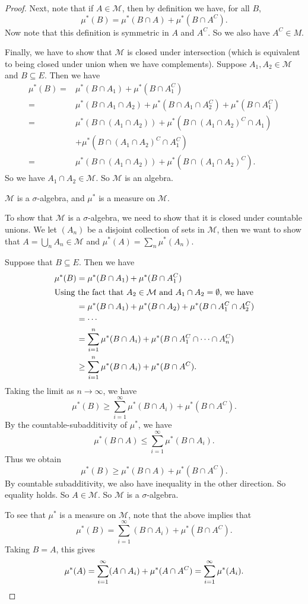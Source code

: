 \documentclass[a4paper]{article}
\begin{document}
\begin{proof}
  Next, note that if $A \in \mathcal{M}$, then by definition we have, for all $B$,
  \[
    \mu^*(B) = \mu^*(B \cap A) + \mu^*(B \cap A^C).
  \]
  Now note that this definition is symmetric in $A$ and $A^C$. So we also have $A^C \in M$.

  Finally, we have to show that $\mathcal{M}$ is closed under intersection (which is equivalent to being closed under union when we have complements). Suppose $A_1, A_2 \in \mathcal{M}$ and $B \subseteq E$. Then we have
  \begin{align*}
    \mu^*(B) ={}& \mu^*(B \cap A_1) + \mu^*(B \cap A_1^C)\\
    ={}& \mu^*(B \cap A_1 \cap A_2) + \mu^*(B \cap A_1 \cap A_2^C) + \mu^*(B \cap A_1^C)\\
    ={}& \mu^*(B \cap (A_1 \cap A_2)) + \mu^*(B \cap (A_1\cap A_2)^C \cap A_1) \\
    &+ \mu^*(B \cap (A_1 \cap A_2)^C \cap A_1^C)\\
    ={}& \mu^*(B \cap (A_1 \cap A_2)) + \mu^*(B \cap (A_1 \cap A_2)^C).
  \end{align*}
  So we have $A_1 \cap A_2 \in \mathcal{M}$. So $\mathcal{M}$ is an algebra.
  \begin{claim}
    $\mathcal{M}$ is a $\sigma$-algebra, and $\mu^*$ is a measure on $\mathcal{M}$.
  \end{claim}
  To show that $\mathcal{M}$ is a $\sigma$-algebra, we need to show that it is closed under countable unions. We let $(A_n)$ be a disjoint collection of sets in $\mathcal{M}$, then we want to show that $A = \bigcup_n A_n \in \mathcal{M}$ and $\mu^*(A) = \sum_n \mu^*(A_n)$.

  Suppose that $B \subseteq E$. Then we have
  \begin{align*}
    \mu^*(B) &= \mu^*(B \cap A_1) + \mu^*(B \cap A_1^C)\\
    \intertext{Using the fact that $A_2 \in \mathcal{M}$ and $A_1 \cap A_2 =\emptyset$, we have}
    &= \mu^*(B \cap A_1) + \mu^*(B \cap A_2) + \mu^*(B \cap A_1^C \cap A_2^C)\\
    &= \cdots\\
    &= \sum_{i = 1}^n \mu^*(B\cap A_i) + \mu^*(B \cap A_1^C \cap \cdots \cap A_n^C)\\
    &\geq \sum_{i = 1}^n \mu^*(B \cap A_i) + \mu^*(B \cap A^C).
  \end{align*}
  Taking the limit as $n \to \infty$, we have
  \[
    \mu^*(B) \geq \sum_{i = 1}^\infty \mu^*(B \cap A_i) + \mu^*(B \cap A^C).
  \]
  By the countable-subadditivity of $\mu^*$, we have
  \[
    \mu^*(B \cap A) \leq \sum_{i = 1}^\infty \mu^*(B \cap A_i).
  \]
  Thus we obtain
  \[
    \mu^*(B) \geq \mu^*(B \cap A) + \mu^*(B \cap A^C).
  \]
  By countable subadditivity, we also have inequality in the other direction. So equality holds. So $A \in \mathcal{M}$. So $\mathcal{M}$ is a $\sigma$-algebra.

  To see that $\mu^*$ is a measure on $\mathcal{M}$, note that the above implies that
  \[
    \mu^*(B) = \sum_{i = 1}^\infty (B \cap A_i) + \mu^*(B \cap A^C).
  \]
  Taking $B = A$, this gives
  \[
    \mu^*(A) = \sum_{i = 1}^\infty (A \cap A_i) + \mu^*(A \cap A^C) = \sum_{i = 1}^\infty \mu^*(A_i).\qedhere
  \]
\end{proof}
\end{document}

